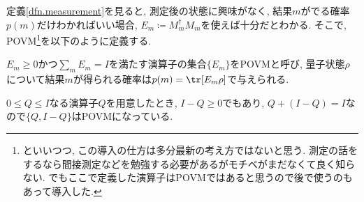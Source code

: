定義\ref{dfn.measurement}を見ると, 測定後の状態に興味がなく, 結果$m$がでる確率$p(m)$だけわかればいい場合, $E_m\coloneqq M_m^\dag M_m$を使えば十分だとわかる. 
そこで, POVM\footnote{といいつつ, この導入の仕方は多分最新の考え方ではないと思う. 測定の話をするなら間接測定などを勉強する必要があるがモチベがまだなくて良く知らない. でもここで定義した演算子はPOVMではあると思うので後で使うのもあって導入した. }を以下のように定義する\cite{nielsen2010quantum}. 

\begin{mydfn}[POVM]\label{dfn.POVM}
  $E_m\geq 0$かつ$\sum_{m}E_m=I$を満たす演算子の集合$\{E_m\}$をPOVMと呼び, 量子状態$\rho$について結果$m$が得られる確率は$p(m)=\tr[E_m\rho]$で与えられる. 
\end{mydfn}

\begin{e.g.}
  $0\leq Q\leq I$なる演算子$Q$を用意したとき, $I-Q\geq 0$でもあり, $Q+(I-Q)=I$なので$\{Q, I-Q\}$はPOVMになっている. 
\end{e.g.}



